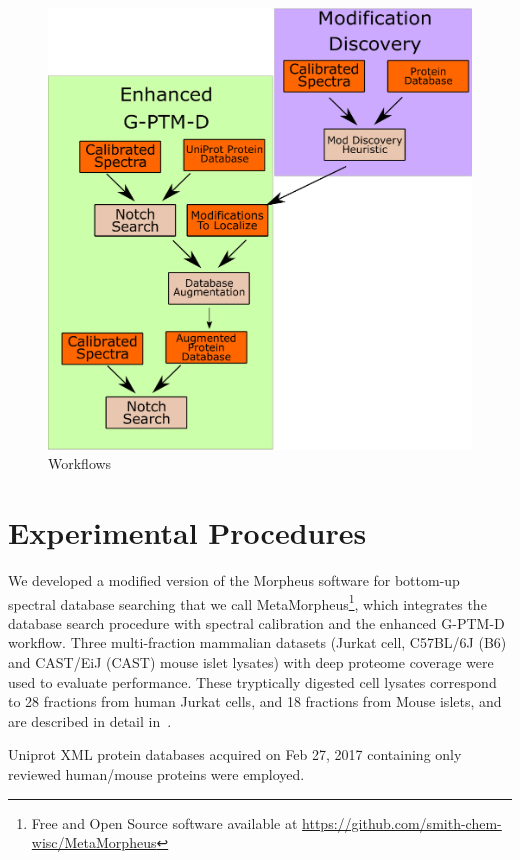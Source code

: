 \documentclass[journal=jprobs,manuscript=article]{achemso}
\begin{document}
\begin{figure}[H]
  \includegraphics[scale=0.5]{diagram.eps}
  \caption{Workflows}
  \label{fgr:diagram}
\end{figure}


\section{Experimental Procedures}

We developed a modified version of the Morpheus software for bottom-up spectral database searching\cite{Wenger_2013} that we call MetaMorpheus\footnote{Free and Open Source software available at \url{https://github.com/smith-chem-wisc/MetaMorpheus}}, which integrates the database search procedure with spectral calibration and the enhanced G-PTM-D workflow.
Three multi-fraction mammalian datasets (Jurkat cell, C57BL/6J (B6) and CAST/EiJ (CAST) mouse islet lysates) with deep proteome coverage were used to evaluate performance.
These tryptically digested cell lysates correspond to 28 fractions from human Jurkat cells, and 18 fractions from Mouse islets, and are described in detail in~\cite{Shortreed_2015, Cesnik_2016}.

Uniprot XML protein databases acquired on Feb 27, 2017 containing only reviewed human/mouse proteins were employed.
\end{document}
